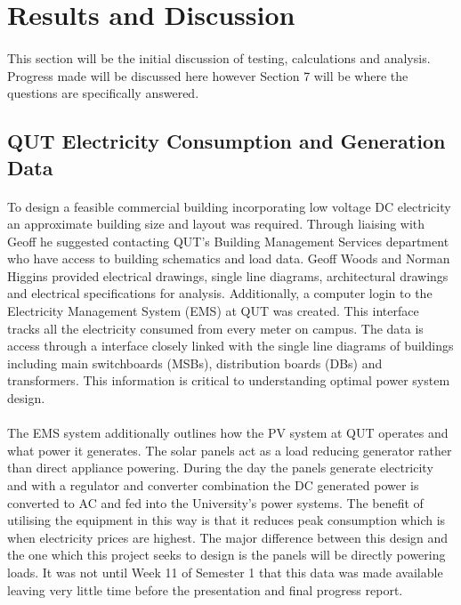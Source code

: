 
\section{Results and Discussion}

\paragraph{}
This section will be the initial discussion of testing, calculations and analysis. Progress made will be discussed here however Section 7 will be where the questions are specifically answered. 


\subsection{QUT Electricity Consumption and Generation Data}

\paragraph{}
To design a feasible commercial building incorporating low voltage DC electricity an approximate building size and layout was required. Through liaising with Geoff he suggested contacting QUT's Building Management Services department who have access to building schematics and load data. Geoff Woods and Norman Higgins provided electrical drawings, single line diagrams, architectural drawings and electrical specifications for analysis. Additionally, a computer login to the Electricity Management System (EMS) at QUT was created. This interface tracks all the electricity consumed from every meter on campus. The data is access through a interface closely linked with the single line diagrams of buildings including main switchboards (MSBs), distribution boards (DBs) and transformers. This information is critical to understanding optimal power system design.  

\paragraph{}
The EMS system additionally outlines how the PV system at QUT operates and what power it generates. The solar panels act as a load reducing generator rather than direct appliance powering. During the day the panels generate electricity and with a regulator and converter combination the DC generated power is converted to AC and fed into the University's power systems. The benefit of utilising the equipment in this way is that it reduces peak consumption which is when electricity prices are highest. The major difference between this design and the one which this project seeks to design is the panels will be directly powering loads. It was not until Week 11 of Semester 1 that this data was made available leaving very little time before the presentation and final progress report.

